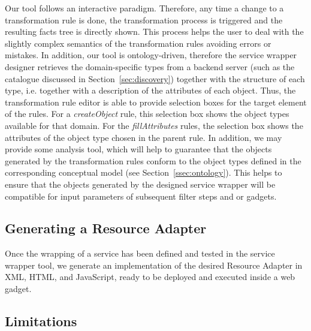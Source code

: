 Our tool follows an interactive paradigm. Therefore, any time a change to a transformation rule is done, the transformation process is triggered and the resulting facts tree is directly shown. This process helps the user to deal with the slightly complex semantics of the transformation rules avoiding errors or mistakes. In addition, our tool is ontology-driven, therefore the service wrapper designer retrieves the domain-specific types from a backend server (such as the catalogue discussed in Section~\ref{sec:discovery}) together with the structure of each type, i.e. together with a description of the attributes of each object. Thus, the transformation rule editor is able to provide selection boxes for the target element of the rules. For a \emph{createObject} rule, this selection box shows the object types available for that domain. For the \emph{fillAttributes} rules, the selection box shows the attributes of the object type chosen in the parent rule. In addition, we may provide some analysis tool, which will help to guarantee that the objects generated by the transformation rules conform to the object types defined in the corresponding conceptual model (see Section~\ref{ssec:ontology}). This helps to ensure that the objects generated by the designed service wrapper will be compatible for input parameters of subsequent filter steps and or gadgets.



\subsection{Generating a Resource Adapter} %
\label{sub:generating_a_resource_adapter}

Once the wrapping of a service has been defined and tested in the service wrapper tool, we generate an implementation of the desired Resource Adapter in XML, HTML, and JavaScript, ready to be deployed and executed inside a web gadget. 


\subsection{Limitations} %
\label{sub:limitations}

